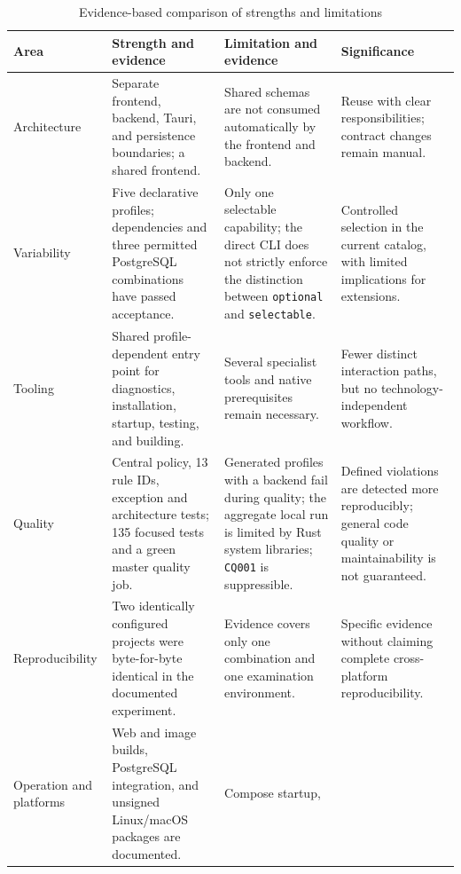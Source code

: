 \begin{table}[htbp]
  \centering
  \scriptsize
  \renewcommand{\arraystretch}{1.08}
  \caption{Evidence-based comparison of strengths and limitations}
  \label{tab:strengths-limitations}
  \begin{tabularx}{\textwidth}{@{}>{\raggedright\arraybackslash}p{}>{\raggedright\arraybackslash}p{}>{\raggedright\arraybackslash}p{}>{\raggedright\arraybackslash}X@{}}
    \toprule
    \textbf{Area} & \textbf{Strength and evidence} & \textbf{Limitation and evidence} & \textbf{Significance} \\
    \midrule
    Architecture & Separate frontend, backend, Tauri, and persistence boundaries;
      a shared frontend. & Shared schemas are not consumed automatically by the
      frontend and backend. & Reuse with clear responsibilities; contract
      changes remain manual. \\
    Variability & Five declarative profiles; dependencies and three permitted
      PostgreSQL combinations have passed acceptance. & Only one selectable
      capability; the direct CLI does not strictly enforce the distinction between
      \texttt{optional} and \texttt{selectable}. &
      Controlled selection in the current catalog, with limited implications for
      extensions. \\
    Tooling & Shared profile-dependent entry point for diagnostics,
      installation, startup, testing, and building. & Several specialist tools and native
      prerequisites remain necessary. & Fewer distinct interaction paths, but no
      technology-independent workflow. \\
    Quality & Central policy, 13 rule IDs, exception and architecture tests;
      135 focused tests and a green master quality job. & Generated profiles
      with a backend fail during quality; the aggregate local run is limited by
      Rust system libraries; \texttt{CQ001} is suppressible. & Defined
      violations are detected more reproducibly; general code quality or
      maintainability is not guaranteed. \\
    Reproducibility & Two identically configured projects were byte-for-byte identical in the
      documented experiment. & Evidence covers only one
      combination and one examination environment. & Specific evidence without
      claiming complete cross-platform reproducibility. \\
    Operation and platforms & Web and image builds, PostgreSQL integration,
      and unsigned Linux/macOS packages are documented. & Compose startup,

\end{tabularx}
\end{table}
